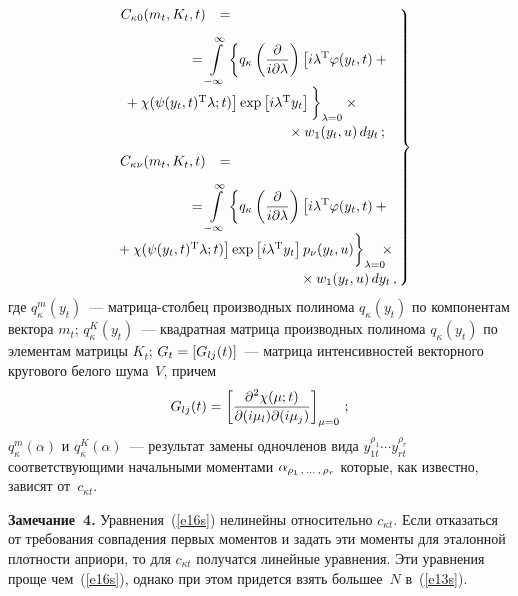 \begin{multicols}{2}
\noindent
\begin{equation}
\left.
\begin{array}{rl}
C_{\kappa 0}(m_t, K_t, t) &={}\\[9pt]
&\hspace*{-8mm}{}=\displaystyle \iin \left\{ q_\kappa \left( \fr{\prt}{i\prt \lambda}\right) 
\left[ i\lambda^{\mathrm{T}} \varphi(y_t, t) +{}\right.\right.\\[9pt]
&\hspace*{-25mm}\left.\left.{}+\chi(\psi(y_t, t)^{\mathrm{T}} \lambda;t)\right]\exp 
\lk i\lambda^{\mathrm{T}} y_t\rk \vphantom{\fr{\partial}{\partial}}
\right\}_{\lambda=0}\times{}\\[9pt]
&\hspace*{17mm}{}\times w_1(y_t,u)\, dy_t\,;\\[9pt]
C_{\kappa \nu}(m_t, K_t, t) &={}\\[9pt]
&\hspace*{-8mm}{}=\displaystyle \iin \left\{ q_\kappa \left( \fr{\prt}{i\prt \lambda}\right) 
\left[ i\lambda^{\mathrm{T}} \varphi(y_t, t) +{}\right.\right.\\[9pt]
&\hspace*{-27mm}\left.\left.{}+\chi(\psi(y_t, t)^{\mathrm{T}} \lambda;t)\right]\exp 
\lk i\lambda^{\mathrm{T}} y_t\rk p_\nu (y_t,u)
\vphantom{\fr{\partial}{\partial}}
\right\}_{\lambda=0}\!\!\!\times{}\\[9pt]
&\hspace*{20mm}{}\times w_1(y_t,u)\, dy_t\,,
\end{array}\!\!
\right\}\!\!
\label{e17-1s}
\end{equation}
где $q_\kappa^m (y_t)$~--- мат\-ри\-ца-стол\-бец производных полинома  $q_\kappa (y_t)$ 
по компонентам вектора  $m_t$; $q_\kappa^K (y_t)$~--- квадратная мат\-ри\-ца 
производных полинома  $q_\kappa (y_t)$ по элементам мат\-ри\-цы  $K_t$; 
$G_t \hm= \lk G_{lj} (t)\rk$~--- мат\-ри\-ца интенсивностей векторного кругового белого шума~$V$, 
причем
    $$
    G_{lj} (t) = \left[ \displaystyle\frac{\displaystyle \partial^2 \chi (\mu;t)\mathstrut}{\displaystyle \partial (i\mu_l) \partial (i\mu_j)\mathstrut}\right]_{\mu=0}\,;
    $$
$q_\kappa^m(\alpha)$  и $q_\kappa^K(\alpha)$~--- 
результат замены одночленов вида $y_{1t}^{\rho_1}\cdots y_{rt}^{\rho_r}$ 
соответствующими  начальными моментами $\alpha_{\rho_1 \,,\,\ldots\,,\, \rho_r}$ которые, 
как известно, зависят от~$c_{\kappa t}$.

\medskip
\noindent
\textbf{Замечание~4.} Уравнения~(\ref{e16s}) нелинейны относительно  $c_{\kappa t}$. 
Если отказаться от требования совпадения первых  моментов и задать эти моменты для 
эталонной плотности априори, то для  $c_{\kappa t}$ получатся линейные уравнения. 
Эти уравнения проще чем~(\ref{e16s}), однако при этом придется взять большее~$N$ в~(\ref{e13s}).


\end{multicols}
